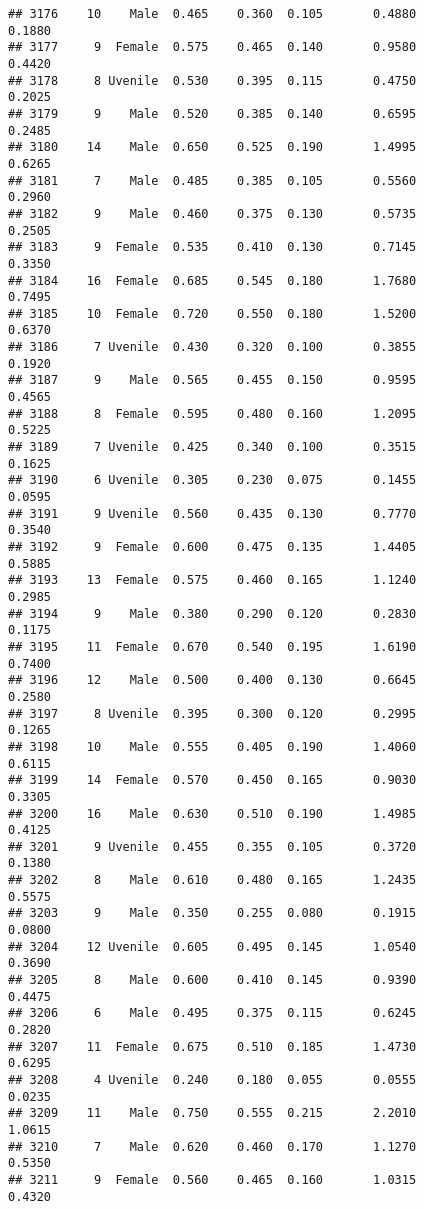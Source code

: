 \documentclass[
]{article}
\begin{document}
\begin{verbatim}
## 3176    10    Male  0.465    0.360  0.105       0.4880         0.1880
## 3177     9  Female  0.575    0.465  0.140       0.9580         0.4420
## 3178     8 Uvenile  0.530    0.395  0.115       0.4750         0.2025
## 3179     9    Male  0.520    0.385  0.140       0.6595         0.2485
## 3180    14    Male  0.650    0.525  0.190       1.4995         0.6265
## 3181     7    Male  0.485    0.385  0.105       0.5560         0.2960
## 3182     9    Male  0.460    0.375  0.130       0.5735         0.2505
## 3183     9  Female  0.535    0.410  0.130       0.7145         0.3350
## 3184    16  Female  0.685    0.545  0.180       1.7680         0.7495
## 3185    10  Female  0.720    0.550  0.180       1.5200         0.6370
## 3186     7 Uvenile  0.430    0.320  0.100       0.3855         0.1920
## 3187     9    Male  0.565    0.455  0.150       0.9595         0.4565
## 3188     8  Female  0.595    0.480  0.160       1.2095         0.5225
## 3189     7 Uvenile  0.425    0.340  0.100       0.3515         0.1625
## 3190     6 Uvenile  0.305    0.230  0.075       0.1455         0.0595
## 3191     9 Uvenile  0.560    0.435  0.130       0.7770         0.3540
## 3192     9  Female  0.600    0.475  0.135       1.4405         0.5885
## 3193    13  Female  0.575    0.460  0.165       1.1240         0.2985
## 3194     9    Male  0.380    0.290  0.120       0.2830         0.1175
## 3195    11  Female  0.670    0.540  0.195       1.6190         0.7400
## 3196    12    Male  0.500    0.400  0.130       0.6645         0.2580
## 3197     8 Uvenile  0.395    0.300  0.120       0.2995         0.1265
## 3198    10    Male  0.555    0.405  0.190       1.4060         0.6115
## 3199    14  Female  0.570    0.450  0.165       0.9030         0.3305
## 3200    16    Male  0.630    0.510  0.190       1.4985         0.4125
## 3201     9 Uvenile  0.455    0.355  0.105       0.3720         0.1380
## 3202     8    Male  0.610    0.480  0.165       1.2435         0.5575
## 3203     9    Male  0.350    0.255  0.080       0.1915         0.0800
## 3204    12 Uvenile  0.605    0.495  0.145       1.0540         0.3690
## 3205     8    Male  0.600    0.410  0.145       0.9390         0.4475
## 3206     6    Male  0.495    0.375  0.115       0.6245         0.2820
## 3207    11  Female  0.675    0.510  0.185       1.4730         0.6295
## 3208     4 Uvenile  0.240    0.180  0.055       0.0555         0.0235
## 3209    11    Male  0.750    0.555  0.215       2.2010         1.0615
## 3210     7    Male  0.620    0.460  0.170       1.1270         0.5350
## 3211     9  Female  0.560    0.465  0.160       1.0315         0.4320

\end{verbatim}
\end{document}
